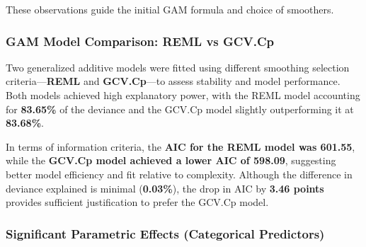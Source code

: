 \documentclass[
]{article}
\begin{document}
These observations guide the initial GAM formula and choice of
smoothers.

\hypertarget{gam-model-comparison-reml-vs-gcv.cp}{%
\subsubsection{GAM Model Comparison: REML vs
GCV.Cp}\label{gam-model-comparison-reml-vs-gcv.cp}}

Two generalized additive models were fitted using different smoothing
selection criteria---\textbf{REML} and \textbf{GCV.Cp}---to assess
stability and model performance. Both models achieved high explanatory
power, with the REML model accounting for \textbf{83.65\%} of the
deviance and the GCV.Cp model slightly outperforming it at
\textbf{83.68\%}.

In terms of information criteria, the \textbf{AIC for the REML model was
601.55}, while the \textbf{GCV.Cp model achieved a lower AIC of 598.09},
suggesting better model efficiency and fit relative to complexity.
Although the difference in deviance explained is minimal
(\textbf{0.03\%}), the drop in AIC by \textbf{3.46 points} provides
sufficient justification to prefer the GCV.Cp model.

\hypertarget{significant-parametric-effects-categorical-predictors}{%
\subsubsection{Significant Parametric Effects (Categorical
Predictors)}\label{significant-parametric-effects-categorical-predictors}}
\end{document}
